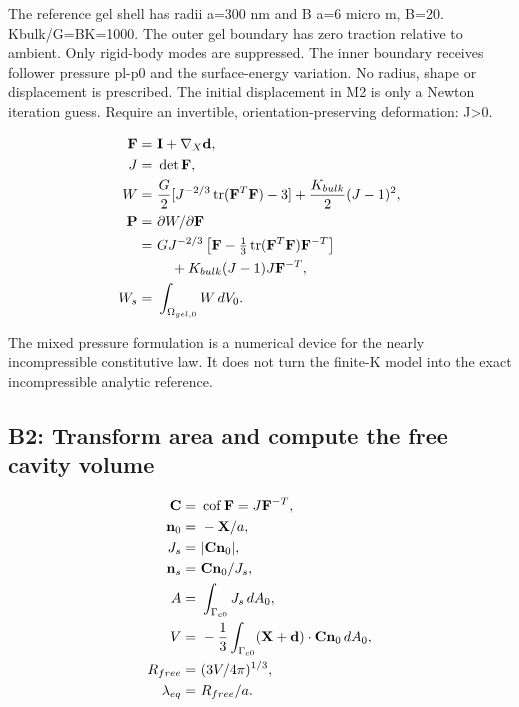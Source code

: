 \documentclass[11pt]{article}
\begin{document}
The reference gel shell has radii a=300 nm and B a=6  micro m, B=20. Kbulk/G=BK=1000. The outer gel boundary has zero traction relative to ambient. Only rigid-body modes are suppressed. The inner boundary receives follower pressure pl-p0 and the surface-energy variation. No radius, shape or displacement is prescribed. The initial displacement in M2 is only a Newton iteration guess. Require an invertible, orientation-preserving deformation: J\textgreater{}0.

\begin{align}
\mathbf F= & ~\mathbf I+\nabla_X\mathbf d, \notag \\
J= & ~\det\mathbf F, \notag \\
W= & ~\frac G2[ J^{-2/3}\operatorname{tr}(\mathbf F^T\mathbf F)-3]+\frac{K_{bulk}}2(J-1)^2, \notag \\
\mathbf P= & ~\partial W/\partial\mathbf F \notag \\
= & ~GJ^{-2/3}\left[\mathbf F-\tfrac13\operatorname{tr}(\mathbf F^T\mathbf F)\mathbf F^{-T}\right] \notag \\
& ~\quad+K_{bulk}(J-1)J\mathbf F^{-T}, \notag \\
W_s= & ~\int_{\Omega_{gel,0}}W\,dV_0. \label{eq:finite_gel_constitutive_law}
\end{align}

The mixed pressure formulation is a numerical device for the nearly incompressible constitutive law. It does not turn the finite-K model into the exact incompressible analytic reference.

\subsection{B2: Transform area and compute the free cavity volume}

\begin{align}
\mathbf C= & ~\operatorname{cof}\mathbf F=J\mathbf F^{-T}, \notag \\
\mathbf n_0= & ~-\mathbf X/a, \notag \\
J_s= & ~|\mathbf C\mathbf n_0|, \notag \\
\mathbf n_s= & ~\mathbf C\mathbf n_0/J_s, \notag \\
A= & ~\int_{\Gamma_{c0}}J_s\,dA_0, \notag \\
V= & ~-\frac13\int_{\Gamma_{c0}}(\mathbf X+\mathbf d)\cdot\mathbf C\mathbf n_0\,dA_0, \notag \\
R_{free}= & ~(3V/4\pi)^{1/3}, \notag \\
\lambda_{eq}= & ~R_{free}/a. \label{eq:deformed_cavity_area_volume}
\end{align}
\end{document}
